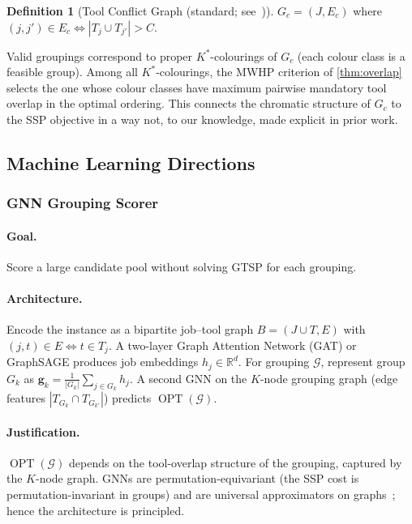 \documentclass[11pt,a4paper]{article}
\theoremstyle{plain}
\theoremstyle{definition}
\newtheorem{definition}[theorem]{Definition}
\DeclareMathOperator{\OPT}{OPT}
\newcommand{\calG}{\mathcal{G}}
\newcommand{\Kstar}{K^{*}}
\begin{document}
\begin{definition}[Tool Conflict Graph {\normalfont(standard; see~\cite{Crama1994})}]
$G_c=(J,E_c)$ where $(j,j')\in E_c\iff|T_j\cup T_{j'}|>C$.
\end{definition}

Valid groupings correspond to proper $\Kstar$-colourings of $G_c$ (each colour class
is a feasible group). Among all $\Kstar$-colourings, the MWHP criterion of
\cref{thm:overlap} selects the one whose colour classes have maximum pairwise mandatory
tool overlap in the optimal ordering.
This connects the chromatic structure of $G_c$ to the SSP objective
in a way not, to our knowledge, made explicit in prior work.

\subsection{Machine Learning Directions}

\subsubsection{GNN Grouping Scorer}
\label{sec:GNN}

\paragraph{Goal.} Score a large candidate pool without solving GTSP for each grouping.

\paragraph{Architecture.}
Encode the instance as a bipartite job--tool graph $B=(J\cup T,E)$
with $(j,t)\in E\iff t\in T_j$.
A two-layer Graph Attention Network (GAT) or GraphSAGE produces job embeddings
$h_j\in\mathbb{R}^d$.
For grouping $\calG$, represent group $G_k$ as
$\mathbf{g}_k=\frac{1}{|G_k|}\sum_{j\in G_k}h_j$.
A second GNN on the $K$-node grouping graph (edge features $|T_{G_k}\cap T_{G_{k'}}|$)
predicts $\OPT(\calG)$.

\paragraph{Justification.}
$\OPT(\calG)$ depends on the tool-overlap structure of the grouping, captured by
the $K$-node graph. GNNs are permutation-equivariant (the SSP cost is
permutation-invariant in groups) and are universal approximators on graphs~\cite{Xu2019};
hence the architecture is principled.
\end{document}
